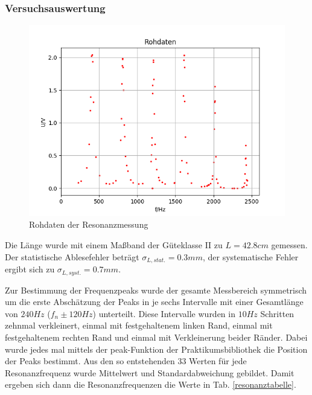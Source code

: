 \documentclass[12pt,a4paper]{article}
\begin{document}
\subsubsection{Versuchsauswertung}
\begin{figure}
\includegraphics[width=\linewidth]{rohres}
\caption{Rohdaten der Resonanzmessung}
\label{fig:rohresonanz}
\end{figure}
Die Länge wurde mit einem Maßband der Güteklasse II zu $L=42.8cm$ gemessen. Der statistische Ablesefehler beträgt $\sigma_{L,stat.}=0.3mm$, der systematische Fehler ergibt sich zu $\sigma_{L,syst.}=0.7mm$.

Zur Bestimmung der Frequenzpeaks wurde der gesamte Messbereich symmetrisch um die erste Abschätzung der Peaks in je sechs Intervalle mit einer Gesamtlänge von $240Hz$ ($f_n \pm 120Hz$) unterteilt. Diese Intervalle wurden in $10Hz$ Schritten zehnmal verkleinert, einmal mit festgehaltenem linken Rand, einmal mit festgehaltenem rechten Rand und einmal mit Verkleinerung beider Ränder. Dabei wurde jedes mal mittels der peak-Funktion der Praktikumsbibliothek die Position der Peaks bestimmt. Aus den so entstehenden 33 Werten für jede Resonanzfrequenz wurde Mittelwert und Standardabweichung gebildet. Damit ergeben sich dann die Resonanzfrequenzen die Werte in Tab. \ref{resonanztabelle}.\\
\end{document}
